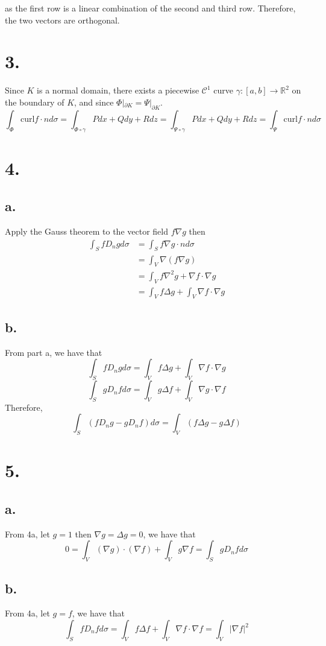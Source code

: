 \documentclass[11pt]{article}
\begin{document}
as the first row is a linear combination of the second and third row. Therefore, the two vectors are orthogonal.
\pagebreak
\section*{3.}
Since $K$ is a normal domain, 
there exists a piecewise $\mathcal{C}^1$ curve 
$\gamma: [a,b] \to \mathbb{R}^2$ on the boundary of $K$, and since $\Phi|_{\partial K} = \Psi|_{\partial K}$. \\
\[
    \int_{\Phi} \text{curl} f \cdot n d\sigma = \int_{\Phi \circ \gamma} Pdx + Qdy + Rdz = \int_{\Psi \circ \gamma} Pdx + Qdy + Rdz = \int_{\Psi} \text{curl} f \cdot n d\sigma 
\]
\pagebreak
\section*{4.}
\subsection*{a.}
Apply the Gauss theorem to the vector field $f\nabla g$ then
\begin{equation*}
    \begin{aligned}
        \int_S f D_n g d\sigma &=  \int_S f \nabla g \cdot n d\sigma \\
        & = \int_V \nabla (f \nabla g) \\
        & = \int_V f \nabla^2 g + \nabla f \cdot \nabla g \\
        & = \int_V f \Delta g + \int_V \nabla f \cdot \nabla g
    \end{aligned}
\end{equation*}
\subsection*{b.}
From part a, we have that 
\[
    \int_S f D_n g d\sigma = \int_V f \Delta g + \int_V \nabla f \cdot \nabla g    
\]
\[
    \int_S g D_n f d\sigma = \int_V g \Delta f + \int_V \nabla g \cdot \nabla f
\]
Therefore, 
\[
    \int_S (f D_n g - g D_n f) d\sigma = \int_V (f \Delta g - g \Delta f)
\]
\pagebreak
\section*{5.}
\subsection*{a.}
From 4a, let $g=1$ then $\nabla g = \Delta g = 0$, we have that 
\[
    0 = \int_V (\nabla g) \cdot (\nabla f) + \int_V g \nabla f = \int_S g D_n f d\sigma
\]
\subsection*{b.}
From 4a, let $g = f$, we have that 
\[
    \int_S f D_n f d\sigma = \int_V f \Delta f + \int_V \nabla f \cdot \nabla f = \int_V |\nabla f|^2
\]
\end{document}
